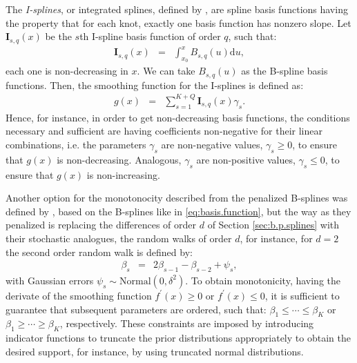 \documentclass[11pt,letterpaper]{article}
\begin{document}
The \textit{I-splines}, or integrated splines,  defined by \cite{Ram88}, are spline basis functions having the property that for each knot, exactly one basis function has nonzero slope.  
Let  $\boldsymbol{I}_{s,q}(x)$ be the $s$th I-spline basis function of order $q$, such that: 
\begin{eqnarray*}
\boldsymbol{I}_{s,q}(x) &=& \int_{x_0}^{x} B_{s,q}(u) \mathrm{d}u ,  
\end{eqnarray*}
each one is  non-decreasing  in $x$. 
We can take $B_{s,q}(u)$ as the B-spline basis functions. 
Then, the smoothing function for the I-splines is defined as:  
\begin{eqnarray*}
g(x) &=& \sum_{s=1}^{K+Q} \boldsymbol{I}_{s,q}(x)  \gamma_{s} .
\end{eqnarray*}
Hence, for instance, in order to get non-decreasing basis functions, the conditions necessary and sufficient are having coefficients non-negative for their linear combinations, i.e. the parameters  $\gamma_s$ are non-negative  values,  $\gamma_s\geq0$, to ensure that $g(x) $ is non-decreasing. Analogous, $\gamma_s$ are non-positive values,  $\gamma_s\leq0$, to ensure that $g(x) $ is non-increasing.
   



Another option for the monotonocity described from the  penalized B-splines was defined by \cite{BreSte08}, based on the B-splines like in \eqref{eq:basis.function}, but the way as they penalized is replacing the differences of order $d$ of Section \ref{sec:b.p.splines} with their stochastic analogues, the random walks of order $d$, for instance, for $d=2$ the second order random walk is defined by: 
\begin{eqnarray*}
\beta_{s} &=&  2 \beta_{s-1} - \beta_{s-2} + \psi_{s} ,
\end{eqnarray*}
with Gaussian errors $\psi_s\sim\mathrm{Normal}(0,\delta^2)$. To obtain monotonicity, having the derivate of the smoothing function  $f^{\prime}(x)\geq0$ or $f^{\prime}(x)\leq0$,  it is sufficient to guarantee that subsequent parameters are ordered, such that: 
$\beta_{1}\leq\cdots\leq\beta_{K}$ 
or
$\beta_{1}\geq\cdots\geq\beta_{K}$,  
respectively.  
These constraints are imposed by introducing indicator functions to truncate the prior distributions appropriately to obtain the desired support, for instance, by using truncated normal distributions.
\end{document}
